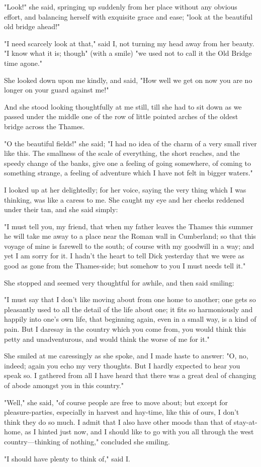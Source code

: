 "Look!" she said, springing up suddenly from her place without any
obvious effort, and balancing herself with exquisite grace and ease;
"look at the beautiful old bridge ahead!"

"I need scarcely look at that," said I, not turning my head away from
her beauty. "I know what it is; though" (with a smile) "we used not to
call it the Old Bridge time agone."

She looked down upon me kindly, and said, "How well we get on now you
are no longer on your guard against me!"

And she stood looking thoughtfully at me still, till she had to sit down
as we passed under the middle one of the row of little pointed arches of
the oldest bridge across the Thames.

"O the beautiful fields!" she said; "I had no idea of the charm of a
very small river like this. The smallness of the scale of everything,
the short reaches, and the speedy change of the banks, give one a
feeling of going somewhere, of coming to something strange, a feeling of
adventure which I have not felt in bigger waters."

I looked up at her delightedly; for her voice, saying the very thing
which I was thinking, was like a caress to me. She caught my eye and her
cheeks reddened under their tan, and she said simply:

"I must tell you, my friend, that when my father leaves the Thames this
summer he will take me away to a place near the Roman wall in
Cumberland; so that this voyage of mine is farewell to the south; of
course with my goodwill in a way; and yet I am sorry for it. I hadn't
the heart to tell Dick yesterday that we were as good as gone from the
Thames-side; but somehow to you I must needs tell it."

She stopped and seemed very thoughtful for awhile, and then said
smiling:

"I must say that I don't like moving about from one home to another; one
gets so pleasantly used to all the detail of the life about one; it fits
so harmoniously and happily into one's own life, that beginning again,
even in a small way, is a kind of pain. But I daresay in the country
which you come from, you would think this petty and unadventurous, and
would think the worse of me for it."

She smiled at me caressingly as she spoke, and I made haste to answer:
"O, no, indeed; again you echo my very thoughts. But I hardly expected
to hear you speak so. I gathered from all I have heard that there was a
great deal of changing of abode amongst you in this country."

"Well," she said, "of course people are free to move about; but except
for pleasure-parties, especially in harvest and hay-time, like this of
ours, I don't think they do so much. I admit that I also have other
moods than that of stay-at-home, as I hinted just now, and I should like
to go with you all through the west country---thinking of nothing,"
concluded she smiling.

"I should have plenty to think of," said I.

